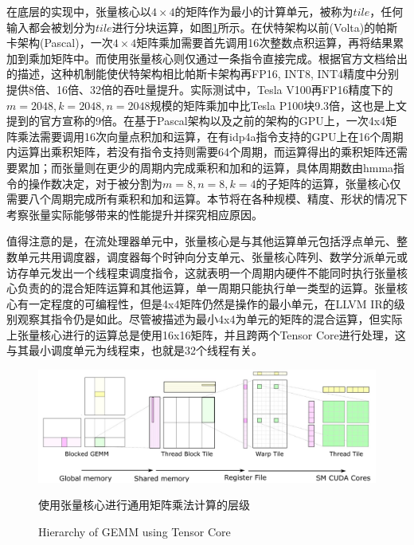 \par 在底层的实现中，张量核心以$ 4 \times 4 $的矩阵作为最小的计算单元，被称为$ tile $，任何输入都会被划分为$ tile $进行分块运算，如图\ref{Fig.Tile}所示\cite{CUTLASS}。在伏特架构以前(Volta)的帕斯卡架构(Pascal)，一次$ 4 \times 4 $矩阵乘加需要首先调用16次整数点积运算，再将结果累加到乘加矩阵中。而使用张量核心则仅通过一条指令直接完成。根据官方文档给出的描述，这种机制能使伏特架构相比帕斯卡架构再FP16, INT8, INT4精度中分别提供8倍、16倍、32倍的吞吐量提升。实际测试中，Tesla V100再FP16精度下的$ m=2048, k=2048, n = 2048 $规模的矩阵乘加中比Tesla P100块9.3倍\cite{VOLTAWHITEPAPER}，这也是上文提到的官方宣称的9倍。在基于Pascal架构以及之前的架构的GPU上，一次4x4矩阵乘法需要调用16次向量点积加和运算，在有idp4a指令支持的GPU上在16个周期内运算出乘积矩阵，若没有指令支持则需要64个周期，而运算得出的乘积矩阵还需要累加；而张量则在更少的周期内完成乘积和加和的运算，具体周期数由hmma指令的操作数决定，对于被分割为$ m=8,n=8,k=4 $的子矩阵的运算，张量核心仅需要八个周期完成所有乘积和加和运算\cite{HMMA}。本节将在各种规模、精度、形状的情况下考察张量实际能够带来的性能提升并探究相应原因。
\par 值得注意的是，在流处理器单元中，张量核心是与其他运算单元包括浮点单元、整数单元共用调度器，调度器每个时钟向分支单元、张量核心阵列、数学分派单元或访存单元发出一个线程束调度指令，这就表明一个周期内硬件不能同时执行张量核心负责的的混合矩阵运算和其他运算，单一周期只能执行单一类型的运算\cite{AMPEREPOR}。张量核心有一定程度的可编程性，但是4x4矩阵仍然是操作的最小单元，在LLVM IR的级别观察其指令仍是如此。尽管被描述为最小4x4为单元的矩阵的混合运算，但实际上张量核心进行的运算总是使用16x16矩阵，并且跨两个Tensor Core进行处理\cite{TENSORCORE}，这与其最小调度单元为线程束，也就是32个线程有关。
\begin{figure}
	\centering
	\includegraphics[width=15cm]{figures/Tile.jpg}
	\renewcommand{\thefigure}{\arabic{section}-\arabic{figure} }
	\renewcommand{\figurename}{图}
	\caption{使用张量核心进行通用矩阵乘法计算的层级\cite{CUTLASS}}
	\addtocounter{figure}{-1}
	\renewcommand{\thefigure}{\arabic{section}-\arabic{figure} }
	\renewcommand{\figurename}{Figure}
	\caption{Hierarchy of GEMM using Tensor Core\cite{CUTLASS}}
	\label{Fig.Tile}
\end{figure}

